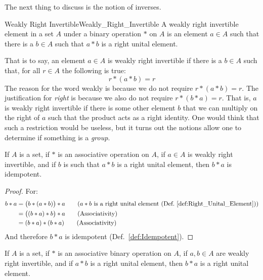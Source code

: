     The next thing to discuss is the notion of inverses.
    \begin{fdefinition}{Weakly Right Invertible}{Weakly_Right_Invertible}
        A weakly right invertible element in a \gls{set} $A$ under a
        \gls{binary operation} $*$ on $A$ is an element $a\in{A}$ such that
        there is a $b\in{A}$ such that $a*b$ is a right unital element.
    \end{fdefinition}
    That is to say, an element $a\in{A}$ is weakly right invertible if there is
    a $b\in{A}$ such that, for all $r\in{A}$ the following is true:
    \begin{equation}
        r*(a*b)=r
    \end{equation}
    The reason for the word weakly is because we do not require $r*(a*b)=r$.
    The justification for \textit{right} is because we also do not require
    $r*(b*a)=r$. That is, $a$ is weakly right invertible if there is some
    other element $b$ that we can multiply on the right of $a$ such that the
    product acts as a right identity. One would think that such a restriction
    would be useless, but it turns out the notions allow one to determine if
    something is a \textit{group}.
    \begin{theorem}
        If $A$ is a set, if $*$ is an associative operation on $A$, if $a\in{A}$
        is weakly right invertible, and if $b$ is such that $a*b$ is a right
        unital element, then $b*a$ is idempotent.
    \end{theorem}
    \begin{proof}
        For:
        \begin{align}
            b*a&=\big(b*(a*b)\big)*a
            \tag{$a*b$ is a right unital element %
                 (Def.~\ref{def:Right_Unital_Element})}\\
            &=\big((b*a)*b\big)*a
            \tag{Associativity}\\
            &=(b*a)*(b*a)
            \tag{Associativity}
        \end{align}
        And therefore $b*a$ is idempotent (Def.~\ref{def:Idempotent}). 
    \end{proof}
    \begin{theorem}
        \label{thm:ab_right_unital_implies_ba_right_unital}%
        If $A$ is a set, if $*$ is an associative binary operation on $A$, if
        $a,b\in{A}$ are weakly right invertible, and if $a*b$ is a right unital
        element, then $b*a$ is a right unital element.
    \end{theorem}
